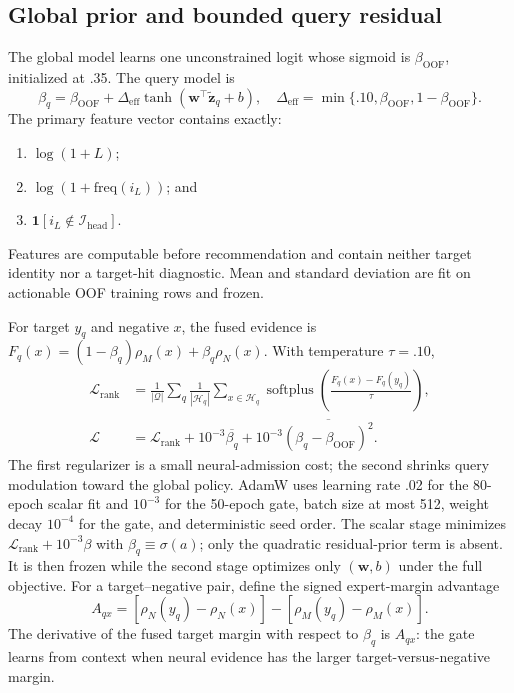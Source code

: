 \documentclass[runningheads]{llncs}
\newcommand{\rr}{\rho}
\begin{document}
\subsection{Global prior and bounded query residual}
The global model learns one unconstrained logit whose sigmoid is
$\beta_{\mathrm{OOF}}$, initialized at .35. The query model is
\begin{equation}
\beta_q=\beta_{\mathrm{OOF}}+
\Delta_{\mathrm{eff}}\tanh(\mathbf w^\top\widetilde{\mathbf z}_q+b),
\quad
\Delta_{\mathrm{eff}}=\min\{.10,\beta_{\mathrm{OOF}},
1-\beta_{\mathrm{OOF}}\}.
\end{equation}
The primary feature vector contains exactly:
\begin{enumerate}
\item $\log(1+L)$;
\item $\log(1+\mathrm{freq}(i_L))$; and
\item $\mathbf1[i_L\notin\mathcal I_{\mathrm{head}}]$.
\end{enumerate}
Features are computable before recommendation and contain neither target
identity nor a target-hit diagnostic. Mean and standard deviation are fit on
actionable OOF training rows and frozen.

For target $y_q$ and negative $x$, the fused evidence is
$F_q(x)=(1-\beta_q)\rr_M(x)+\beta_q\rr_N(x)$. With temperature $\tau=.10$,
\begin{align}
\mathcal L_{\mathrm{rank}}
&=\frac1{|\mathcal Q|}\sum_q\frac1{|\mathcal H_q|}
\sum_{x\in\mathcal H_q}
\operatorname{softplus}\!\left(
\frac{F_q(x)-F_q(y_q)}{\tau}\right),\\
\mathcal L
&=\mathcal L_{\mathrm{rank}}
+10^{-3}\overline{\beta_q}
+10^{-3}\overline{(\beta_q-\beta_{\mathrm{OOF}})^2}.
\end{align}
The first regularizer is a small neural-admission cost; the second shrinks
query modulation toward the global policy. AdamW uses learning rate .02 for
the 80-epoch scalar fit and $10^{-3}$ for the 50-epoch gate, batch size at
most 512, weight decay $10^{-4}$ for the gate, and deterministic seed order.
The scalar stage minimizes
$\mathcal L_{\mathrm{rank}}+10^{-3}\beta$ with
$\beta_q\equiv\sigma(a)$; only the quadratic residual-prior term is absent.
It is then frozen while the second stage optimizes only $(\mathbf w,b)$ under
the full objective.
For a target--negative pair, define the signed expert-margin advantage
\[
A_{qx}=[\rr_N(y_q)-\rr_N(x)]-[\rr_M(y_q)-\rr_M(x)].
\]
The derivative of the fused target margin with respect to $\beta_q$ is
$A_{qx}$: the gate learns from context when neural evidence has the larger
target-versus-negative margin.
\end{document}
